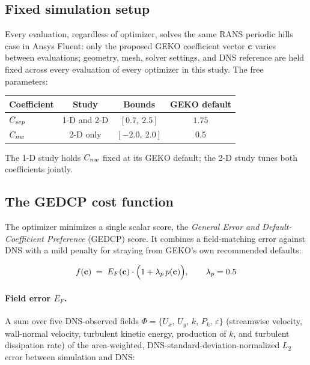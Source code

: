 \subsection{Fixed simulation setup}
\label{sec:cfd-setup}

Every evaluation, regardless of optimizer, solves the same RANS periodic
hills case in Ansys Fluent: only the proposed GEKO coefficient vector
$\mathbf{c}$ varies between evaluations; geometry, mesh, solver settings,
and DNS reference are held fixed across every evaluation of every optimizer
in this study.  The free parameters:

\begin{center}
\begin{tabular}{@{}lccc@{}}
\toprule
Coefficient & Study & Bounds & GEKO default \\
\midrule
$C_{sep}$ & 1-D and 2-D & $[0.7,\ 2.5]$  & $1.75$ \\
$C_{nw}$  & 2-D only    & $[-2.0,\ 2.0]$ & $0.5$ \\
\bottomrule
\end{tabular}
\end{center}

The 1-D study holds $C_{nw}$ fixed at its GEKO default; the 2-D study tunes
both coefficients jointly.

\subsection{The GEDCP cost function}
\label{sec:cfd-costfn}

The optimizer minimizes a single scalar score, the \emph{General Error and
Default-Coefficient Preference} (GEDCP) score.  It combines a field-matching
error against DNS with a mild penalty for straying from GEKO's own
recommended defaults:

\begin{equation}
f(\mathbf{c}) \;=\; E_F(\mathbf{c}) \cdot \Bigl(1 + \lambda_p\, p(\mathbf{c})\Bigr),
\qquad \lambda_p = 0.5
\label{eq:gedcp}
\end{equation}

\paragraph{Field error $E_F$.} A sum over five DNS-observed fields
$\Phi = \{U_x,\, U_y,\, k,\, P_k,\, \varepsilon\}$ (streamwise velocity,
wall-normal velocity, turbulent kinetic energy, production of $k$, and
turbulent dissipation rate) of the area-weighted,
DNS-standard-deviation-normalized $L_2$ error between simulation and DNS:

